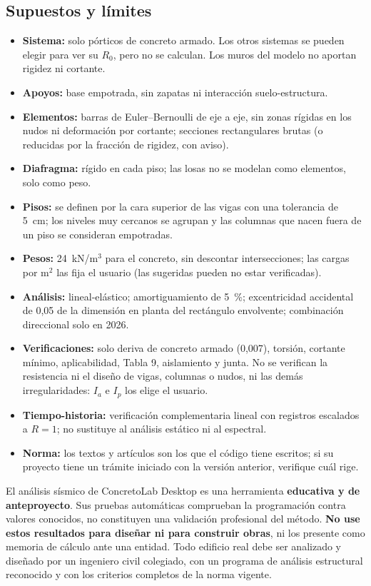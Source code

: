 \subsection{Supuestos y límites}
\label{sec:sis-limites}

\begin{itemize}
	\item \textbf{Sistema:} solo pórticos de concreto armado. Los otros sistemas se pueden elegir para ver su $R_0$, pero
	      no se calculan. Los muros del modelo no aportan rigidez ni cortante.
	\item \textbf{Apoyos:} base empotrada, sin zapatas ni interacción suelo-estructura.
	\item \textbf{Elementos:} barras de Euler--Bernoulli de eje a eje, sin zonas rígidas en los nudos ni deformación por
	      cortante; secciones rectangulares brutas (o reducidas por la fracción de rigidez, con aviso).
	\item \textbf{Diafragma:} rígido en cada piso; las losas no se modelan como elementos, solo como peso.
	\item \textbf{Pisos:} se definen por la cara superior de las vigas con una tolerancia de 5~cm; los niveles muy cercanos
	      se agrupan y las columnas que nacen fuera de un piso se consideran empotradas.
	\item \textbf{Pesos:} 24~kN/m$^3$ para el concreto, sin descontar intersecciones; las cargas por m$^2$ las fija el
	      usuario (las sugeridas pueden no estar verificadas).
	\item \textbf{Análisis:} lineal-elástico; amortiguamiento de 5~\%; excentricidad accidental de 0,05 de la dimensión en
	      planta del rectángulo envolvente; combinación direccional solo en 2026.
	\item \textbf{Verificaciones:} solo deriva de concreto armado (0,007), torsión, cortante mínimo, aplicabilidad, Tabla 9,
	      aislamiento y junta. No se verifican la resistencia ni el diseño de vigas, columnas o nudos, ni las demás
	      irregularidades: $I_a$ e $I_p$ los elige el usuario.
	\item \textbf{Tiempo-historia:} verificación complementaria lineal con registros escalados a $R = 1$; no sustituye al
	      análisis estático ni al espectral.
	\item \textbf{Norma:} los textos y artículos son los que el código tiene escritos; si su proyecto tiene un trámite
	      iniciado con la versión anterior, verifique cuál rige.
\end{itemize}

\begin{advertencia}
El análisis sísmico de ConcretoLab Desktop es una herramienta \textbf{educativa y de anteproyecto}. Sus pruebas
automáticas comprueban la programación contra valores conocidos, no constituyen una validación profesional del método.
\textbf{No use estos resultados para diseñar ni para construir obras}, ni los presente como memoria de cálculo ante una
entidad. Todo edificio real debe ser analizado y diseñado por un ingeniero civil colegiado, con un programa de análisis
estructural reconocido y con los criterios completos de la norma vigente.
\end{advertencia}
